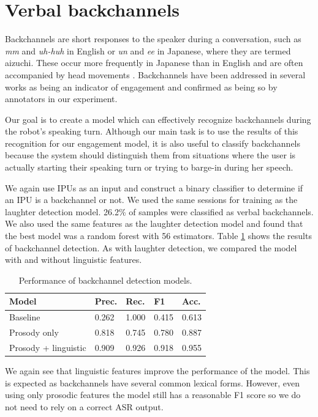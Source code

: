 \documentclass[letterpaper]{article} %
\begin{document}
\section{Verbal backchannels}
Backchannels are short responses to the speaker during a conversation, such as \textit{mm} and \textit{uh-huh} in English or \textit{un} and \textit{ee} in Japanese, where they are termed aizuchi. These occur more frequently in Japanese than in English and are often accompanied by head movements \cite{Ike2010}. Backchannels have been addressed in several works as being an indicator of engagement \cite{Rich2010,Oertel2015} and confirmed as being so by annotators in our experiment.

Our goal is to create a model which can effectively recognize backchannels during the robot's speaking turn. Although our main task is to use the results of this recognition for our engagement model, it is also useful to classify backchannels because the system should distinguish them from situations where the user is actually starting their speaking turn or trying to barge-in during her speech.

We again use IPUs as an input and construct a binary classifier to determine if an IPU is a backchannel or not. We used the same sessions for training as the laughter detection model. 26.2\% of samples were classified as verbal backchannels. We also used the same features as the laughter detection model and found that the best model was a random forest with 56 estimators. Table \ref{bcresults} shows the results of backchannel detection. As with laughter detection, we compared the model with and without linguistic features.

\begin{table}[h]
\begin{center}
\begin{tabular}{|l|l|l|l|l|}
\hline \bf Model & \bf Prec. & \bf Rec. & \bf F1 & \bf Acc. \\ \hline
Baseline & 0.262 & 1.000 & 0.415 & 0.613 \\
Prosody only & 0.818 & 0.745 & 0.780 & 0.887 \\
Prosody + linguistic & 0.909 & 0.926 & 0.918 & 0.955\\
\hline
\end{tabular}
\end{center}
\caption{\label{bcresults} Performance of backchannel detection models.}
\end{table}

We again see that linguistic features improve the performance of the model. This is expected as backchannels have several common lexical forms. However, even using only prosodic features the model still has a reasonable F1 score so we do not need to rely on a correct ASR output.
\end{document}
